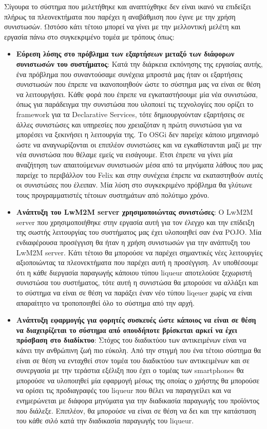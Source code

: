 Σίγουρα το σύστημα που μελετήθηκε και αναπτύχθηκε δεν είναι ικανό να επιδείξει πλήρως τα πλεονεκτήματα που παρέχει η αναβάθμιση που έγινε με την χρήση συνιστωσών. Ωστόσο κάτι τέτοιο μπορεί να γίνει με την μελλοντική μελέτη και εργασία πάνω στο συγκεκριμένο τομέα με τρόπους όπως:

\begin{itemize}
	\item{\textbf{Εύρεση λύσης στο πρόβλημα των εξαρτήσεων μεταξύ των διάφορων συνιστωσών του συστήματος}: Κατά την διάρκεια εκπόνησης της εργασίας αυτής, ένα πρόβλημα που συναντούσαμε συνέχεια μπροστά μας ήταν οι εξαρτήσεις συνιστωσών που έπρεπε να ικανοποιηθούν ώστε το σύστημα μας να είναι σε θέση να λειτουργήσει. Κάθε φορά που έπρεπε να εγκαταστήσουμε μία νέα συνιστώσα, όπως για παράδειγμα την συνιστώσα που υλοποιεί τις τεχνολογίες που ορίζει το framework για τα Declarative Services, τότε δημιουργούνταν εξαρτήσεις σε άλλες συνιστώσες και υπηρεσίες που χρειαζόταν η πρώτη συνιστώσα για να μπορέσει να ξεκινήσει η λειτουργία της. Το OSGi δεν παρείχε κάποιο μηχανισμό ώστε να αναγνωρίζονται οι επιπλέον συνιστώσες και να εγκαθίστανται μαζί με την νέα συνιστώσα που θέλαμε εμείς να εισάγουμε. Έτσι έπρεπε να γίνει μία αναζήτηση των απαιτούμενων συνιστωσών μέσα από τα μηνύματα λάθους που μας παρείχε το περιβάλλον του Felix και στην συνέχεια έπρεπε να εκαταστηθούν αυτές οι συνιστώσες που έλειπαν. Μία λύση στο συγκεκριμένο πρόβλημα θα γλύτωνε τους προγραμματιστές τέτοιων συστημάτων από πολύτιμο χρόνο.}
	\item{\textbf{Ανάπτυξη του LwM2M server χρησιμοποιώντας συνιστώσες}: Ο LwM2M server που χρησιμοποιήθηκε στην εργασία αυτή για τον έλεγχο και την επίδειξη της σωστής λειτουργίας του συστήματος μας έχει υλοποιηθεί σαν ένα POJO. Μία ενδιαφέρουσα προσέγγιση θα ήταν η χρήση συνιστωσών για την ανάπτυξη του LwM2M server. Κάτι τέτοιο θα μπορούσε να παρέχει σημαντικές νέες λειτουργίες αξιοποιώντας τα πλεονεκτήματα που παρέχει αυτή η προσέγγιση. Αν υποθέσουμε ότι η κάθε διεργασία παραγωγής κάποιου τύπου liqueur αποτελούσε ξεχωριστή συνιστώσα του συστήματος, τότε αυτή η συνιστώσα θα μπορούσε να αλλάξει και το σύστημα να είναι σε θέση να παράξει έναν νέο τύπου liqeuer χωρίς να είναι απαραίτητο να τροποποιηθεί όλο το σύστημα από την αρχή.}
	\item{\textbf{Ανάπτυξη εφαρμογής για φορητές συσκευές ώστε κάποιος να είναι σε θέση να διαχειρίζεται το σύστημα από οπουδήποτε βρίσκεται αρκεί να έχει πρόσβαση στο διαδίκτυο}: Στόχος του διαδικτύου των αντικειμένων είναι να κάνει την ανθρώπινη ζωή πιο εύκολη. Από την στιγμή που ένα τέτοιο σύστημα θα είναι σε θέση να ενταχθεί στον τομέα του διαδικτύου των αντικειμένων και σε συνεργασία με την τεράστια εξέλιξη που έχει ο τομέας των smartphones θα μπορούσε να υλοποιηθεί μία εφαρμογή μέσως της οποίας ο χρήστης θα μπορούσε να ορίσει τις προδιαγραφές του liqueur που θέλει να παραγγείλει και να ενημερώνεται με διάφορα μηνύματα για την διαδικασία παραγωγής του προϊόντος που διάλεξε. Επιπλέον, θα μπορούσε να είναι σε θέση να δει και την κατάσταση του κάθε σιλό κατά την διαδικασία παραγωγής του liqueur.}

\end{itemize}
